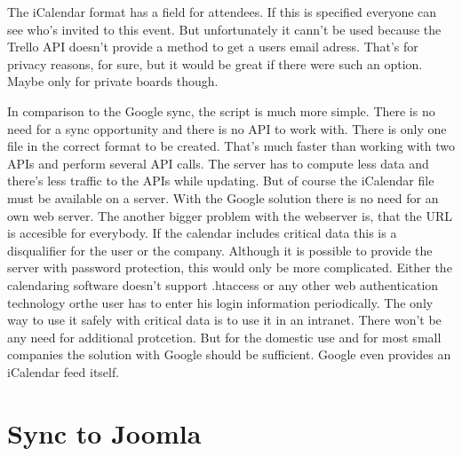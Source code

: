 
The iCalendar format has a field for attendees. If this is specified everyone can see who's invited to this event. But unfortunately it cann't be used because the Trello API doesn't provide a method to get a users email adress. That's for privacy reasons, for sure, but it would be great if there were such an option. Maybe only for private boards though. 

In comparison to the Google sync, the script is much more simple. There is no need for a sync opportunity and there is no API to work with. There is only one file in the correct format to be created. That's much faster than working with two APIs and perform several API calls. The server has to compute less data and there's less traffic to the APIs while updating. But of course the iCalendar file must be available on a server. With the Google solution there is no need for an own web server. The another bigger problem with the webserver is, that the URL is accesible for everybody. If the calendar includes critical data this is a disqualifier for the user or the company. Although it is possible to provide the server with password protection, this would only be more complicated. Either the calendaring software doesn't support .htaccess or any other web authentication technology orthe user has to enter his login information periodically. The only way to use it safely with critical data is to use it in an intranet. There won't be any need for additional protcetion. But for the domestic use and for most small companies the solution with Google  should be sufficient. Google even provides an iCalendar feed itself. 

\section{Sync to Joomla}








